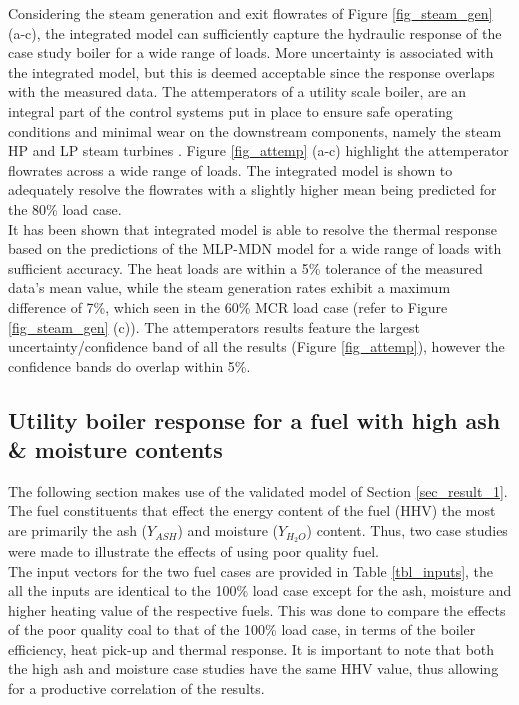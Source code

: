 \documentclass[a4paper,fleqn]{cas-dc}
\begin{document}
Considering the steam generation and exit flowrates of Figure \ref{fig_steam_gen} (a-c), the integrated model can sufficiently capture the hydraulic response of the case study boiler for a wide range of loads. More uncertainty is associated with the integrated model, but this is deemed acceptable since the response overlaps with the measured data. The attemperators of a utility scale boiler, are an integral part of the control systems put in place to ensure safe operating conditions and minimal wear on the downstream components, namely the steam HP and LP steam turbines \cite{Kakac1991}. Figure  \ref{fig_attemp} (a-c) highlight the attemperator flowrates across a wide range of loads. The integrated model is shown to adequately resolve the flowrates with a slightly higher mean being predicted for the 80\% load case.\\

It has been shown that integrated model is able to resolve the thermal response based on the predictions of the MLP-MDN model for a wide range of loads with sufficient accuracy. The heat loads are within a 5\% tolerance of the measured data's mean value, while the steam generation rates exhibit a maximum difference of 7\%, which seen in the 60\% MCR load case (refer to Figure \ref{fig_steam_gen} (c)). The attemperators results feature the largest uncertainty/confidence band of all the results (Figure \ref{fig_attemp}), however the confidence bands do overlap within 5\%. 
\subsection{Utility boiler response for a fuel with high ash \& moisture contents}
The following section makes use of the validated model of Section \ref{sec_result_1}. The fuel constituents that effect the energy content of the fuel (HHV) the most are primarily the ash ($Y_{ASH}$) and moisture ($Y_{H_{2}O}$) content. Thus, two case studies were made to illustrate the effects of using poor quality fuel.\\

The input vectors for the two fuel cases are provided in Table \ref{tbl_inputs}, the all the inputs are identical to the 100\% load case except for the ash, moisture and higher heating value of the respective fuels. This was done to compare the effects of the poor quality coal to that of the 100\% load case, in terms of the boiler efficiency, heat pick-up and thermal response. It is important to note that both the high ash and moisture case studies have the same HHV value, thus allowing for a productive correlation of the results.\\
\end{document}
